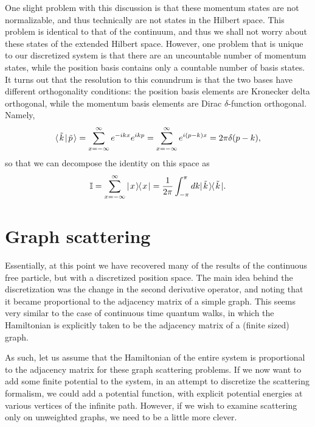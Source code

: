 \documentclass[../thesis-main/thesis-main]{subfiles}
\begin{document}
One slight problem with this discussion is that these momentum states are not normalizable, and thus technically are not states in the Hilbert space.  This problem is identical to that of the continuum, and thus we shall not worry about these states of the extended Hilbert space.  However, one problem that is unique to our discretized system is that  there are an uncountable number of momentum states, while the position basis contains only a countable number of basis states.  It turns out that the resolution to this conundrum is that the two bases have different orthogonality conditions: the position basis elements are Kronecker delta orthogonal, while the momentum basis elements are Dirac $\delta$-function orthogonal.  Namely,
\begin{equation}
  \langle\mspace{2mu} \tilde{k} \mspace{2mu} | \mspace{2mu} \tilde{p}\mspace{2mu} \rangle = \sum_{x=-\infty}^\infty e^{- i k x} e^{i k p} = \sum_{x=-\infty}^\infty e^{i (p-k) x} = 2\pi \delta(p-k),
\end{equation}
so that we can decompose the identity on this space as 
\begin{equation}
\mathbb{I} = \sum_{x=-\infty}^\infty |\mspace{2mu} x \mspace{2mu} \rangle\mspace{-2mu}\langle\mspace{2mu} x \mspace{2mu} | = \frac{1}{2\pi} \int_{-\pi}^\pi dk |\mspace{2mu} \tilde{k} \mspace{2mu} \rangle\mspace{-2mu}\langle\mspace{2mu} \tilde{k} \mspace{2mu} |.
\end{equation}


\section{Graph scattering}

Essentially, at this point we have recovered many of the results of the continuous free particle, but with a discretized position space.  The main idea behind the discretization was the change in the second derivative operator, and noting that it became proportional to the adjacency matrix of a simple graph.  This seems very similar to the case of continuous time quantum walks, in which the Hamiltonian is explicitly taken to be the adjacency matrix of a (finite sized) graph. 

As such, let us assume that the Hamiltonian of the entire system is proportional to the adjacency matrix for these graph scattering problems.  If we now want to add some finite potential to the system, in an attempt to discretize the scattering formalism, we could add a potential function, with explicit potential energies at various vertices of the infinite path.  However, if we wish to examine scattering only on unweighted graphs, we need to be a little more clever.  
\end{document}
